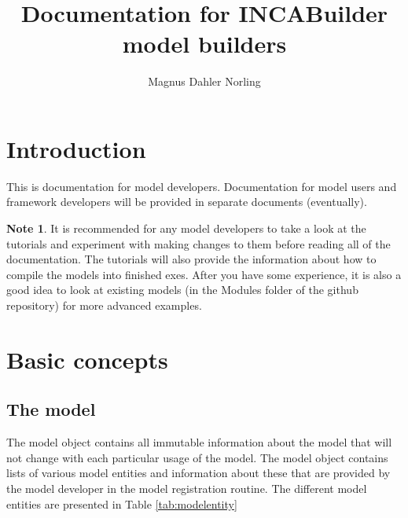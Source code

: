 \documentclass[11pt]{article}
\title{Documentation for INCABuilder model builders}
\author{Magnus Dahler Norling}
\theoremstyle{definition}
\newtheorem{mynote}{Note}
\newenvironment{note}%
  {\begin{lrbox}{\notebox}%
   \begin{minipage}{\dimexpr\linewidth-2\fboxsep}
   \begin{mynote}}%
  {\end{mynote}%
   \end{minipage}%
   \end{lrbox}%
   \begin{trivlist}
     \item[]\colorbox{silver}{\usebox\notebox}
   \end{trivlist}}
\begin{document}
\maketitle

\tableofcontents

\section{Introduction}
This is documentation for model developers. Documentation for model users and framework developers will be provided in separate documents (eventually).

\begin{note}
It is recommended for any model developers to take a look at the tutorials and experiment with making changes to them before reading all of the documentation. The tutorials will also provide the information about how to compile the models into finished exes. After you have some experience, it is also a good idea to look at existing models (in the Modules folder of the github repository) for more advanced examples.
\end{note}

\section{Basic concepts}

\subsection{The model}

The model object contains all immutable information about the model that will not change with each particular usage of the model. The model object contains lists of various model entities and information about these that are provided by the model developer in the model registration routine. The different model entities are presented in Table \ref{tab:modelentity}
\end{document}

